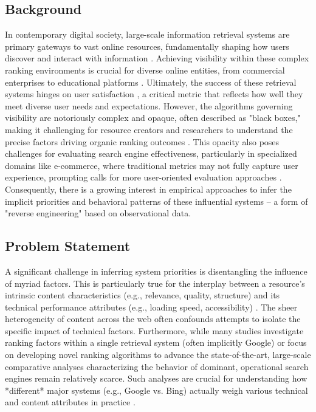 \documentclass[a4paper,fleqn]{cas-sc}
\begin{document}
\subsection{Background}
\label{subsec:background}
In contemporary digital society, large-scale information retrieval systems are primary gateways to vast online resources, fundamentally shaping how users discover and interact with information \citep{Coghlan2025}. Achieving visibility within these complex ranking environments is crucial for diverse online entities, from commercial enterprises to educational platforms \citep{Daly2024, Limongelli2022}. Ultimately, the success of these retrieval systems hinges on user satisfaction \citep{Wang2023}, a critical metric that reflects how well they meet diverse user needs and expectations. However, the algorithms governing visibility are notoriously complex and opaque, often described as "black boxes," making it challenging for resource creators and researchers to understand the precise factors driving organic ranking outcomes \citep{Coghlan2025, Roumeliotis2022}. This opacity also poses challenges for evaluating search engine effectiveness, particularly in specialized domains like e-commerce, where traditional metrics may not fully capture user experience, prompting calls for more user-oriented evaluation approaches \citep{Moffat2024}. Consequently, there is a growing interest in empirical approaches to infer the implicit priorities and behavioral patterns of these influential systems – a form of "reverse engineering" based on observational data.


\subsection{Problem Statement}
\label{subsec:problem}
A significant challenge in inferring system priorities is disentangling the influence of myriad factors. This is particularly true for the interplay between a resource's intrinsic content characteristics (e.g., relevance, quality, structure) and its technical performance attributes (e.g., loading speed, accessibility) \citep{Nagpal2021, Srinivas2025}. The sheer heterogeneity of content across the web often confounds attempts to isolate the specific impact of technical factors. Furthermore, while many studies investigate ranking factors within a single retrieval system (often implicitly Google) or focus on developing novel ranking algorithms to advance the state-of-the-art, large-scale comparative analyses characterizing the behavior of dominant, operational search engines remain relatively scarce. Such analyses are crucial for understanding how *different* major systems (e.g., Google vs. Bing) actually weigh various technical and content attributes in practice \citep{Toms2004}.
\end{document}
